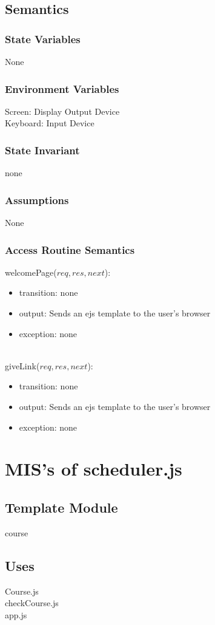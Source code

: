 \documentclass[11pt, oneside]{article}
\begin{document}
\subsection* {Semantics}
\subsubsection* {State Variables}
None
\subsubsection*{Environment Variables}
Screen: Display Output Device \\
Keyboard: Input Device \\

\subsubsection* {State Invariant}
none
\subsubsection* {Assumptions}
None
\subsubsection* {Access Routine Semantics}
welcomePage($req, res, next$):
\begin{itemize}
\item transition: none
\item output: Sends an ejs template to the user's browser
\item exception:
 none
\end{itemize}
\\
\noIndent
giveLink($req, res, next$):
\begin{itemize}
\item transition: none
\item output: Sends an ejs template to the user's browser
\item exception:
 none
\end{itemize}
\newpage

\section{MIS's of scheduler.js}
\subsection*{Template Module}
course
\subsection* {Uses}
Course.js \\
checkCourse.js \\
app.js \\
\end{document}
